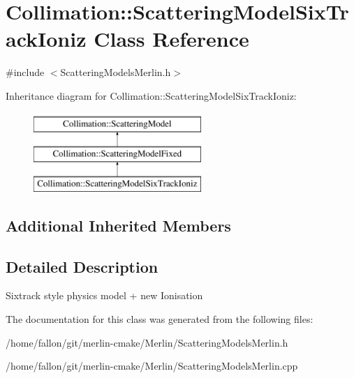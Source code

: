 \hypertarget{classCollimation_1_1ScatteringModelSixTrackIoniz}{}\section{Collimation\+:\+:Scattering\+Model\+Six\+Track\+Ioniz Class Reference}
\label{classCollimation_1_1ScatteringModelSixTrackIoniz}


{\ttfamily \#include $<$Scattering\+Models\+Merlin.\+h$>$}

Inheritance diagram for Collimation\+:\+:Scattering\+Model\+Six\+Track\+Ioniz\+:\begin{figure}[H]
\begin{center}
\leavevmode
\includegraphics[height=3.000000cm]{classCollimation_1_1ScatteringModelSixTrackIoniz}
\end{center}
\end{figure}
\subsection*{Additional Inherited Members}


\subsection{Detailed Description}
Sixtrack style physics model + new Ionisation 

The documentation for this class was generated from the following files\+:\begin{DoxyCompactItemize}
\item 
/home/fallon/git/merlin-\/cmake/\+Merlin/Scattering\+Models\+Merlin.\+h\item 
/home/fallon/git/merlin-\/cmake/\+Merlin/Scattering\+Models\+Merlin.\+cpp\end{DoxyCompactItemize}
